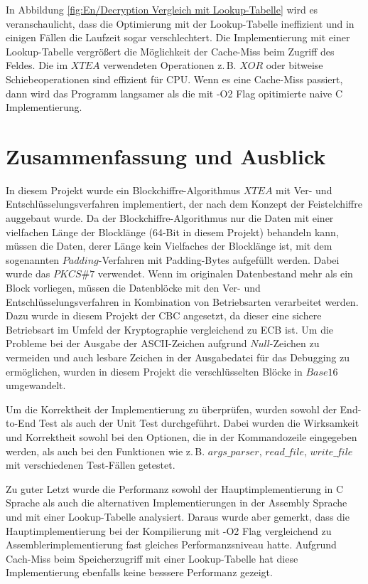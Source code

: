 \documentclass[course=erap]{aspdoc}
\begin{document}
In Abbildung \ref{fig:En/Decryption Vergleich mit Lookup-Tabelle} wird es veranschaulicht, dass die Optimierung mit der Lookup-Tabelle ineffizient und in einigen Fällen die Laufzeit sogar verschlechtert. Die Implementierung mit einer Lookup-Tabelle vergrößert die Möglichkeit der Cache-Miss beim Zugriff des Feldes. Die im $XTEA$ verwendeten Operationen z.\,B. $XOR$ oder bitweise Schiebeoperationen sind effizient für CPU. Wenn es eine Cache-Miss passiert, dann wird das Programm langsamer als die mit -O2 Flag opitimierte naive C Implementierung.

\section{Zusammenfassung und Ausblick}
In diesem Projekt wurde ein Blockchiffre-Algorithmus $XTEA$ mit Ver- und Entschlüsselungsverfahren implementiert, der nach dem Konzept der Feistelchiffre auggebaut wurde. Da der Blockchiffre-Algorithmus nur die Daten mit einer vielfachen Länge der Blocklänge (64-Bit in diesem Projekt) behandeln kann, müssen die Daten, derer Länge kein Vielfaches der Blocklänge ist, mit dem sogenannten $Padding$-Verfahren mit Padding-Bytes aufgefüllt werden. Dabei wurde das $PKCS\#7$ verwendet. Wenn im originalen Datenbestand mehr als ein Block vorliegen, müssen die Datenblöcke mit den Ver- und Entschlüsselungsverfahren in Kombination von Betriebsarten verarbeitet werden. Dazu wurde in diesem Projekt der CBC angesetzt, da dieser eine sichere Betriebsart im Umfeld der Kryptographie vergleichend zu ECB ist. Um die Probleme bei der Ausgabe der ASCII-Zeichen aufgrund $Null$-Zeichen zu vermeiden und auch lesbare Zeichen in der Ausgabedatei für das Debugging zu ermöglichen, wurden in diesem Projekt die verschlüsselten Blöcke in $Base16$ umgewandelt.

Um die Korrektheit der Implementierung zu überprüfen, wurden sowohl der End-to-End Test als auch der Unit Test durchgeführt. Dabei wurden die Wirksamkeit und Korrektheit sowohl bei den Optionen, die in der Kommandozeile eingegeben werden, als auch bei den Funktionen wie z.\,B. $args\_parser$, $read\_file$, $write\_file$ mit verschiedenen Test-Fällen getestet.

Zu guter Letzt wurde die Performanz sowohl der Hauptimplementierung in C Sprache als auch die alternativen Implementierungen in der Assembly Sprache und mit einer Lookup-Tabelle analysiert. Daraus wurde aber gemerkt, dass die Hauptimplementierung bei der Kompilierung mit -O2 Flag vergleichend zu Assemblerimplementierung fast gleiches Performanzsniveau hatte. Aufgrund Cach-Miss beim Speicherzugriff mit einer Lookup-Tabelle hat diese Implementierung ebenfalls keine besssere Performanz gezeigt.


{}
\end{document}
